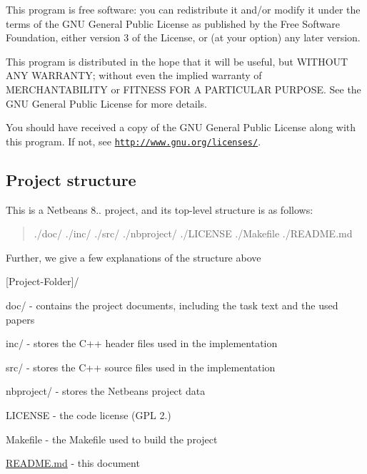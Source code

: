 This program is free software\+: you can redistribute it and/or modify it under the terms of the G\+N\+U General Public License as published by the Free Software Foundation, either version 3 of the License, or (at your option) any later version.

This program is distributed in the hope that it will be useful, but W\+I\+T\+H\+O\+U\+T A\+N\+Y W\+A\+R\+R\+A\+N\+T\+Y; without even the implied warranty of M\+E\+R\+C\+H\+A\+N\+T\+A\+B\+I\+L\+I\+T\+Y or F\+I\+T\+N\+E\+S\+S F\+O\+R A P\+A\+R\+T\+I\+C\+U\+L\+A\+R P\+U\+R\+P\+O\+S\+E. See the G\+N\+U General Public License for more details.

You should have received a copy of the G\+N\+U General Public License along with this program. If not, see \href{http://www.gnu.org/licenses/}{\tt http\+://www.\+gnu.\+org/licenses/}.

\subsection*{Project structure}

This is a Netbeans 8.. project, and its\textquotesingle{} top-\/level structure is as follows\+:

\begin{quote}
./doc/ ./inc/ ./src/ ./nbproject/ ./\+L\+I\+C\+E\+N\+S\+E ./\+Makefile ./\+R\+E\+A\+D\+M\+E.md \end{quote}


Further, we give a few explanations of the structure above


\begin{DoxyItemize}
\item \mbox{[}Project-\/\+Folder\mbox{]}/
\begin{DoxyItemize}
\item doc/ -\/ contains the project documents, including the task text and the used papers
\item inc/ -\/ stores the C++ header files used in the implementation
\item src/ -\/ stores the C++ source files used in the implementation
\item nbproject/ -\/ stores the Netbeans project data
\item L\+I\+C\+E\+N\+S\+E -\/ the code license (G\+P\+L 2.)
\item Makefile -\/ the Makefile used to build the project
\item \hyperlink{_r_e_a_d_m_e_8md}{R\+E\+A\+D\+M\+E.\+md} -\/ this document
\end{DoxyItemize}
\end{DoxyItemize}

